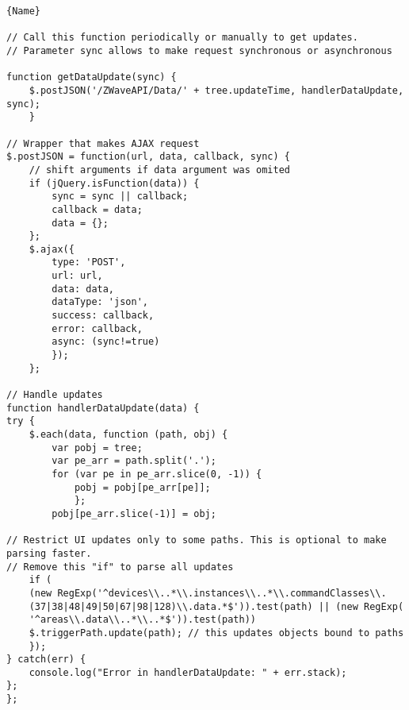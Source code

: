\begin{lstlisting}[caption=Data Update]{Name}

// Call this function periodically or manually to get updates.
// Parameter sync allows to make request synchronous or asynchronous

function getDataUpdate(sync) {
	$.postJSON('/ZWaveAPI/Data/' + tree.updateTime, handlerDataUpdate, sync);
	}

// Wrapper that makes AJAX request
$.postJSON = function(url, data, callback, sync) {
	// shift arguments if data argument was omited
	if (jQuery.isFunction(data)) {
		sync = sync || callback;
		callback = data;
		data = {};
	};
	$.ajax({
		type: 'POST',
		url: url,
		data: data,
		dataType: 'json',
		success: callback,
		error: callback,
		async: (sync!=true)
		});
	};

// Handle updates
function handlerDataUpdate(data) {
try {
	$.each(data, function (path, obj) {
		var pobj = tree;
		var pe_arr = path.split('.');
		for (var pe in pe_arr.slice(0, -1)) {
			pobj = pobj[pe_arr[pe]];
			};
		pobj[pe_arr.slice(-1)] = obj;

// Restrict UI updates only to some paths. This is optional to make parsing faster. 
// Remove this "if" to parse all updates
	if (
	(new RegExp('^devices\\..*\\.instances\\..*\\.commandClasses\\.
	(37|38|48|49|50|67|98|128)\\.data.*$')).test(path) || (new RegExp(
	'^areas\\.data\\..*\\..*$')).test(path))
	$.triggerPath.update(path); // this updates objects bound to paths
	});
} catch(err) {
	console.log("Error in handlerDataUpdate: " + err.stack);
};
};
\end{lstlisting}